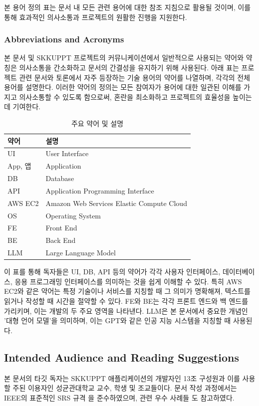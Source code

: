\documentclass[a4paper, 12pt]{article}
\begin{document}
본 용어 정의 표는 문서 내 모든 관련 용어에 대한 참조 지침으로 활용될 것이며, 이를 통해 효과적인 의사소통과 프로젝트의 원활한 진행을 지원한다.

\subsubsection{Abbreviations and Acronyms}

본 문서 및 SKKUPPT 프로젝트의 커뮤니케이션에서 일반적으로 사용되는 약어와 약칭은 의사소통을 간소화하고 문서의 간결성을 유지하기 위해 사용된다. 아래 표는 프로젝트 관련 문서와 토론에서 자주 등장하는 기술 용어의 약어를 나열하며, 각각의 전체 용어를 설명한다. 이러한 약어의 정의는 모든 참여자가 용어에 대한 일관된 이해를 가지고 의사소통할 수 있도록 함으로써, 혼란을 최소화하고 프로젝트의 효율성을 높이는 데 기여한다.

\begin{table}[H]
\centering
\begin{tabularx}{\textwidth}{|l|X|}
\hline
\textbf{약어} & \textbf{설명} \\
\hline
UI & User Interface \\
\hline
App, 앱 & Application \\
\hline
DB & Database \\
\hline
API & Application Programming Interface \\
\hline
AWS EC2 & Amazon Web Services Elastic Compute Cloud \\
\hline
OS & Operating System \\
\hline
FE & Front End \\
\hline
BE & Back End \\
\hline
LLM & Large Language Model \\
\hline
\end{tabularx}
\caption{주요 약어 및 설명}
\label{table:abbreviations}
\end{table}



이 표를 통해 독자들은 UI, DB, API 등의 약어가 각각 사용자 인터페이스, 데이터베이스, 응용 프로그래밍 인터페이스를 의미하는 것을 쉽게 이해할 수 있다. 특히 AWS EC2와 같은 약어는 특정 기술이나 서비스를 지칭할 때 그 의미가 명확해져, 텍스트를 읽거나 작성할 때 시간을 절약할 수 있다. FE와 BE는 각각 프론트 엔드와 백 엔드를 가리키며, 이는 개발의 두 주요 영역을 나타낸다. LLM은 본 문서에서 중요한 개념인 '대형 언어 모델'을 의미하며, 이는 GPT와 같은 인공 지능 시스템을 지칭할 때 사용된다.


\subsection{Intended Audience and Reading Suggestions}
본 문서의 타깃 독자는 SKKUPPT 애플리케이션의 개발자인 13조 구성원과 이를 사용할 주된 이용자인 성균관대학교 교수, 학생 및 조교들이다. 문서 작성 과정에서는 IEEE의 표준적인 SRS 규격 \cite{ieee830}을 준수하였으며, 관련 우수 사례들 \cite{parkingo}\cite{skkunare}도 참고하였다.
\end{document}
